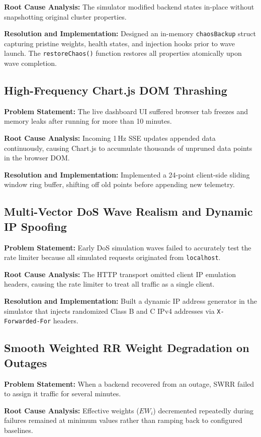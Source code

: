 \documentclass[12pt,openany]{report}
\begin{document}
\textbf{Root Cause Analysis:} The simulator modified backend states in-place without snapshotting original cluster properties.

\textbf{Resolution and Implementation:} Designed an in-memory \texttt{chaosBackup} struct capturing pristine weights, health states, and injection hooks prior to wave launch. The \texttt{restoreChaos()} function restores all properties atomically upon wave completion.

\subsection{High-Frequency Chart.js DOM Thrashing}
\textbf{Problem Statement:} The live dashboard UI suffered browser tab freezes and memory leaks after running for more than 10 minutes.

\textbf{Root Cause Analysis:} Incoming 1\,Hz SSE updates appended data continuously, causing Chart.js to accumulate thousands of unpruned data points in the browser DOM.

\textbf{Resolution and Implementation:} Implemented a 24-point client-side sliding window ring buffer, shifting off old points before appending new telemetry.

\subsection{Multi-Vector DoS Wave Realism and Dynamic IP Spoofing}
\textbf{Problem Statement:} Early DoS simulation waves failed to accurately test the rate limiter because all simulated requests originated from \texttt{localhost}.

\textbf{Root Cause Analysis:} The HTTP transport omitted client IP emulation headers, causing the rate limiter to treat all traffic as a single client.

\textbf{Resolution and Implementation:} Built a dynamic IP address generator in the simulator that injects randomized Class B and C IPv4 addresses via \texttt{X-Forwarded-For} headers.

\subsection{Smooth Weighted RR Weight Degradation on Outages}
\textbf{Problem Statement:} When a backend recovered from an outage, SWRR failed to assign it traffic for several minutes.

\textbf{Root Cause Analysis:} Effective weights ($EW_i$) decremented repeatedly during failures remained at minimum values rather than ramping back to configured baselines.
\end{document}
